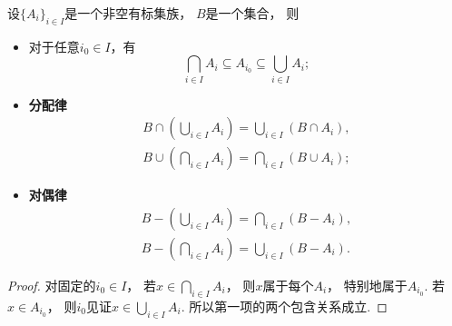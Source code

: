 \begin{theorem}
    设\(\{A_i\}_{i \in I}\)是一个非空有标集族，
    \(B\)是一个集合，
    则
    \begin{itemize}
        \item 对于任意\(i_0 \in I\)，有
        \begin{equation*}
            \bigcap_{i \in I} A_i \subseteq A_{i_0} \subseteq \bigcup_{i \in I} A_i;
        \end{equation*}

        \item {\rm\bf 分配律}
        \begin{gather*}
            B \cap \left( \bigcup_{i \in I} A_i \right)
            = \bigcup_{i \in I} \left( B \cap A_i \right), \\
            B \cup \left( \bigcap_{i \in I} A_i \right)
            = \bigcap_{i \in I} \left( B \cup A_i \right);
        \end{gather*}

        \item {\rm\bf 对偶律}
        \begin{gather*}
            B - \left( \bigcup_{i \in I} A_i \right)
            = \bigcap_{i \in I} \left( B - A_i \right), \\
            B - \left( \bigcap_{i \in I} A_i \right)
            = \bigcup_{i \in I} \left( B - A_i \right).
        \end{gather*}
    \end{itemize}
    \begin{proof}
        对固定的\(i_0\in I\)，
        若\(x\in\bigcap_{i\in I}A_i\)，
        则\(x\)属于每个\(A_i\)，
        特别地属于\(A_{i_0}\).
        若\(x\in A_{i_0}\)，
        则\(i_0\)见证\(x\in\bigcup_{i\in I}A_i\).
        所以第一项的两个包含关系成立.


\end{proof}
\end{theorem}
